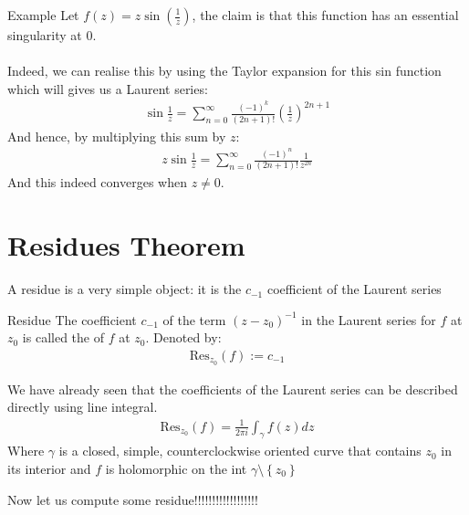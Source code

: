 
\begin{parag}{Example}
    Let $f\left(z\right) = z \sin\left(\frac{1}{z}\right)$, the claim is that this function has an essential singularity at $0$.\\
	$ $\\
	Indeed, we can realise this by using the Taylor expansion for this sin function which will gives us a Laurent series:
	\begin{align*} 
		\sin\frac{1}{z} = \sum_{n= 0}^{\infty}\frac{\left(-1\right)^{k}}{\left(2n + 1\right)!}\left(\frac{1}{z}\right)^{2n+1}
	\end{align*}
	And hence, by multiplying this sum by $z$:
	\begin{align*} 
		z \sin\frac{1}{z} = \sum_{n= 0}^{\infty}\frac{\left(-1\right)^{n}}{\left(2n + 1\right)!}\frac{1}{z^{2n}}
	\end{align*}
	And this indeed converges when $z\neq 0$.
\end{parag}

\section{Residues Theorem}
A residue is a very simple object: it is the $c_{-1}$ coefficient of the Laurent series
\begin{definition}{Residue}
	The coefficient $c_{-1}$ of the term $\left(z - z_0\right)^{-1}$ in the Laurent series for $f$ at $z_0$ is called the  of $f$ at $z_0$. Denoted by:
	\begin{align*} 
		\text{Res}_{z_0}\left(f\right) := c_{-1}
	\end{align*}
\end{definition}
\begin{framedremark}\label{rem:definitionRes}
We have already seen that the coefficients of the Laurent series can be described directly using line integral.
\begin{align*} 
	\text{Res}_{z_0}\left(f\right) = \frac{1}{2\pi i}\int_{\gamma}f\left(z\right)dz
\end{align*}
Where $\gamma$ is a closed, simple, counterclockwise oriented curve that contains $z_0$ in its interior and $f$ is holomorphic on the int $\gamma \setminus \left\{z_0\right\}$
\end{framedremark}

Now let us compute some residue!!!!!!!!!!!!!!!!!!

